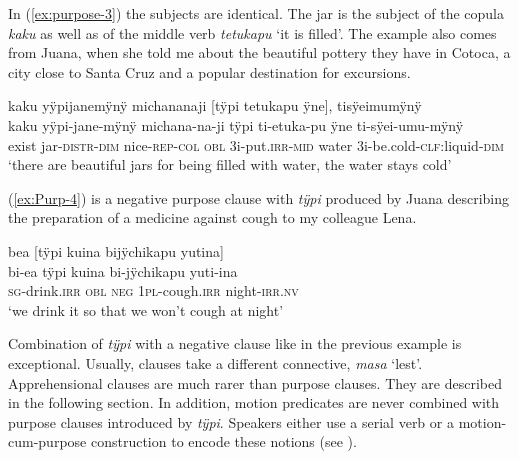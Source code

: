 In (\ref{ex:purpose-3}) the subjects are identical. The jar is the subject of the copula \textit{kaku} as well as of the middle verb \textit{tetukapu} ‘it is filled’. The example also comes from Juana, when she told me about the beautiful pottery they have in Cotoca, a city close to Santa Cruz and a popular destination for excursions.

\ea\label{ex:purpose-3}
\begingl
\glpreamble kaku yÿpijanemÿnÿ michananaji \textup{[}tÿpi tetukapu ÿne\textup{]}, tisÿeimumÿnÿ\\
\gla kaku yÿpi-jane-mÿnÿ michana-na-ji tÿpi ti-etuka-pu ÿne ti-sÿei-umu-mÿnÿ\\
\glb exist jar-\textsc{distr}-\textsc{dim} nice-\textsc{rep}-\textsc{col} \textsc{obl} 3i-put.\textsc{irr}-\textsc{mid} water 3i-be.cold-\textsc{clf:}liquid-\textsc{dim}\\
\glft ‘there are beautiful jars for being filled with water, the water stays cold’
\endgl
\trailingcitation{[jxx-p120430l-2.594-596]}
\xe


(\ref{ex:Purp-4}) is a negative purpose clause with \textit{tÿpi} produced by Juana describing the preparation of a medicine against cough to my colleague Lena.

\ea\label{ex:Purp-4}
\begingl
\glpreamble bea \textup{[}tÿpi kuina bijÿchikapu yutina\textup{]}\\
\gla bi-ea tÿpi kuina bi-jÿchikapu yuti-ina\\
\textsc{sg}-drink.\textsc{irr} \textsc{obl} \textsc{neg} 1\textsc{pl}-cough.\textsc{irr} night-\textsc{irr.nv}\\
\glft ‘we drink it so that we won’t cough at night’
\endgl
\trailingcitation{[jxx-e191021e-2]}
\xe


Combination of \textit{tÿpi} with a negative clause like in the previous example is exceptional. Usually,  clauses take a different connective, \textit{masa} ‘lest’. Apprehensional clauses are much rarer than purpose clauses. They are described in the following section. In addition, motion predicates are never combined with purpose clauses introduced by \textit{tÿpi}. Speakers either use a serial verb or a motion-cum-purpose construction to encode these notions (see ). 


%
%
{}

